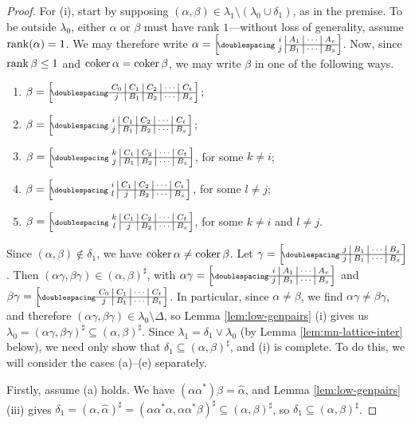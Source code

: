 \begin{lemma}
\begin{proof}
    For (i), start by supposing
    $(\alpha, \beta) \in \lambda_1 \setminus (\lambda_0 \cup \delta_1)$, as in
    the premise.  To be outside $\lambda_0$, either $\alpha$ or $\beta$ must
    have rank $1$---without loss of generality, assume $\operatorname{rank}(\alpha)=1$.  We
    may therefore write
    $\alpha=\bipart{c|c|c|c}{2-4}{i&A_1&\cdots&A_r}{j&B_1&\cdots&B_s}$.  Now,
    since $\operatorname{rank}\beta \leq 1$ and $\operatorname{coker}\alpha = \operatorname{coker}\beta$, we may write
    $\beta$ in one of the following ways.
    \begin{enumerate}[\rm(a)]
    \item $\beta = \bipart{c|c|c|c|c}{1-5}
      {C_0 & C_1 & C_2 & \cdots & C_t}{j & B_1 & B_2 & \cdots & B_s}$;
    \item $\beta = \bipart{c|c|c|c|c}{2-5}
      {i & C_1 & C_2 & \cdots & C_t}{j & B_1 & B_2 & \cdots & B_s}$;
    \item $\beta = \bipart{c|c|c|c|c}{2-5}
      {k & C_1 & C_2 & \cdots & C_t}{j & B_1 & B_2 & \cdots & B_s}$,
      for some $k \neq i$;
    \item $\beta = \bipart{c|c|c|c|c}{2-5}
      {i & C_1 & C_2 & \cdots & C_t}{l & j & B_2 & \cdots & B_s}$,
      for some $l \neq j$;
    \item $\beta = \bipart{c|c|c|c|c}{2-5}
      {k & C_1 & C_2 & \cdots & C_t}{l & j & B_2 & \cdots & B_s}$,
      for some $k \neq i$ and $l \neq j$.
    \end{enumerate}
    Since $(\alpha,\beta) \notin \delta_1$, we have
    $\operatorname{coker}\alpha \neq \operatorname{coker}\beta$.  Let
    $\gamma = \bipart{c|c|c|c}{1-4}
    {j & B_1 & \cdots & B_s}{j & B_1 & \cdots & B_s}$.  Then
    $(\alpha\gamma, \beta\gamma) \in (\alpha,\beta)^\sharp$, with
    $\alpha\gamma = \bipart{c|c|c|c}{1-4}
    {i & A_1 & \cdots & A_r}{j & B_1 & \cdots & B_s}$ and
    $\beta\gamma = \bipart{c|c|c|c}{1-4}
    {C_0 & C_1 & \cdots & C_t}{j & B_1 & \cdots & B_t}$.  In particular,
    since $\alpha \neq \beta$, we find $\alpha\gamma \neq \beta\gamma$, and
    therefore $(\alpha\gamma, \beta\gamma) \in \lambda_0 \setminus \Delta$, so
    Lemma \ref{lem:low-genpairs} (i) gives us
    $\lambda_0=(\alpha\gamma, \beta\gamma)^\sharp
    \subseteq (\alpha, \beta)^\sharp$.
    Since $\lambda_1 = \delta_1 \vee \lambda_0$ (by Lemma
    \ref{lem:mn-lattice-inter} below), we need only show that $\delta_1
    \subseteq (\alpha,\beta)^\sharp$, and (i) is complete.
    To do this, we will consider the cases (a)--(e) separately.

    Firstly, assume (a) holds.  We have
    $(\alpha\alpha^*)\beta = \widehat\alpha$, and Lemma
    \ref{lem:low-genpairs} (iii) gives
    $\delta_1 = (\alpha, \widehat\alpha)^\sharp = (\alpha\alpha^*\alpha,
    \alpha\alpha^*\beta)^\sharp \subseteq (\alpha,\beta)^\sharp$, so
    $\delta_1 \subseteq (\alpha, \beta)^\sharp$.


\end{proof}
\end{lemma}
